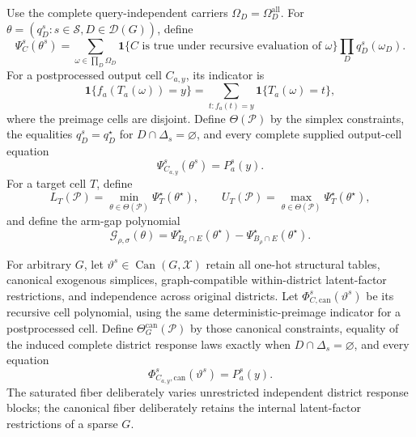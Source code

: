 Use the complete query-independent carriers \(\Omega_D=\Omega_D^{\mathrm{all}}\).  For \(\theta=(q_D^s:s\in\mathcal S,D\in\mathcal D(G))\), define
\[
\Psi_C^s(\theta^s)=
\sum_{\omega\in\prod_D\Omega_D}
\mathbf 1\{C\text{ is true under recursive evaluation of }\omega\}
\prod_Dq_D^s(\omega_D).
\]
For a postprocessed output cell \(C_{a,y}\), its indicator is
\[
\mathbf 1\{f_a(T_a(\omega))=y\}
=\sum_{t:f_a(t)=y}\mathbf 1\{T_a(\omega)=t\},
\]
where the preimage cells are disjoint.  Define \(\Theta(\mathcal P)\) by the simplex constraints, the equalities \(q_D^s=q_D^\star\) for \(D\cap\Delta_s=\varnothing\), and every complete supplied output-cell equation
\[
\Psi_{C_{a,y}}^s(\theta^s)=P_a^s(y).
\]
For a target cell \(T\), define
\[
L_T(\mathcal P)=\min_{\theta\in\Theta(\mathcal P)}
\Psi_T^\star(\theta^\star),
\qquad
U_T(\mathcal P)=\max_{\theta\in\Theta(\mathcal P)}
\Psi_T^\star(\theta^\star),
\]
and define the arm-gap polynomial
\[
\mathcal G_{\rho,\sigma}(\theta)=
\Psi_{B_\sigma\cap E}^\star(\theta^\star)
-\Psi_{B_\rho\cap E}^\star(\theta^\star).
\]

For arbitrary \(G\), let \(\vartheta^s\in\operatorname{Can}(G,\mathcal X)\) retain all one-hot structural tables, canonical exogenous simplices, graph-compatible within-district latent-factor restrictions, and independence across original districts.  Let \(\Phi_{C,\mathrm{can}}^s(\vartheta^s)\) be its recursive cell polynomial, using the same deterministic-preimage indicator for a postprocessed cell.  Define \(\Theta_G^{\mathrm{can}}(\mathcal P)\) by those canonical constraints, equality of the induced complete district response laws exactly when \(D\cap\Delta_s=\varnothing\), and every equation
\[
\Phi_{C_{a,y},\mathrm{can}}^s(\vartheta^s)=P_a^s(y).
\]
The saturated fiber deliberately varies unrestricted independent district response blocks; the canonical fiber deliberately retains the internal latent-factor restrictions of a sparse \(G\).